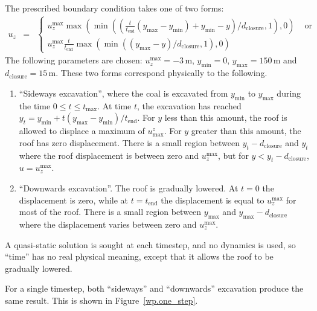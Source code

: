 \documentclass[]{scrreprt}
\begin{document}
The prescribed boundary condition takes one of two forms:
\begin{eqnarray}
u_{z} & = & \left\{
\begin{array}{ll}
u_{z}^{\mathrm{max}} \max\left( \min\left( \left(
\frac{t}{t_{\mathrm{end}}}(y_{\mathrm{max}} - y_{\mathrm{min}}) +
y_{\mathrm{min}} - y \right) / d_{\mathrm{closure}}, 1 \right),
0\right) & \mbox{ or} \\
u_{z}^{\mathrm{max}} \frac{t}{t_{\mathrm{end}}} \max\left( \min\left(
(y_{\mathrm{max}} - y)/d_{\mathrm{closure}}, 1 \right), 0\right)
\end{array}
\right.
\end{eqnarray}
The following parameters are chosen: $u_{z}^{\mathrm{max}} = -3$\,m,
$y_{\mathrm{min}} = 0$, $y_{\mathrm{max}}=150$\,m and
$d_{\mathrm{closure}}=15$\,m.  These two forms correspond physically
to the following.
\begin{enumerate}
\item ``Sideways excavation'', where the coal is excavated from
  $y_{\mathrm{min}}$ to $y_{\mathrm{max}}$ during the time $0\leq
  t\leq t_{\mathrm{max}}$.  At time $t$, the excavation has reached $y_{t}
  = y_{\mathrm{min}} + t(y_{\mathrm{max}} -
    y_{\mathrm{min}})/t_{\mathrm{end}}$.  For $y$ less than this
    amount, the roof is allowed to displace a maximum
  of $u^{z}_{\mathrm{max}}$.  For $y$ greater than this amount, the
  roof has zero displacement.  There is a small region between
  $y_{t}-d_{\mathrm{closure}}$ and $y_{t}$ where the roof displacement
  is between zero and $u_{z}^{\mathrm{max}}$, but for
  $y<y_{t}-d_{\mathrm{closure}}$, $u = u_{z}^{\mathrm{max}}$.
\item ``Downwards excavation''.  The roof is gradually lowered.  At
  $t=0$ the displacement is zero, while at $t=t_{\mathrm{end}}$ the
  displacement is equal to $u_{z}^{\mathrm{max}}$ for most of the
  roof.  There is a small region between $y_{\mathrm{max}}$ and
  $y_{\mathrm{max}} - d_{\mathrm{closure}}$ where the displacement
  varies between zero and $u_{z}^{\mathrm{max}}$.
\end{enumerate}
A quasi-static solution is sought at each timestep, and no dynamics is
used, so ``time'' has no real physical meaning, except that it allows
the roof to be gradually lowered.

For a single timestep, both ``sideways'' and ``downwards'' excavation
produce the same result.  This is shown in Figure~\ref{wp.one_step}.
\end{document}
